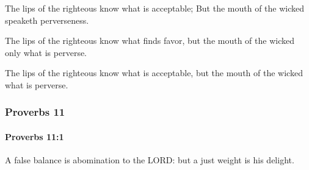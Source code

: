 			\begin{versebox}
					\item[BHS] 
					\item[ASV] The lips of the righteous know what is acceptable; But the mouth of the wicked speaketh perverseness.
					\item[NIV] The lips of the righteous know what finds favor, but the mouth of the wicked only what is perverse.
					\item[NRSV] The lips of the righteous know what is acceptable, but the mouth of the wicked what is perverse.
			\end{versebox}
	\subsubsection{Proverbs 11} %
		\label{PROVERBS-11}

		\paragraph{Proverbs 11:1} %
			\label{PROVERBS-11-1}

			A false balance is abomination to the LORD: but a just weight is his delight.

